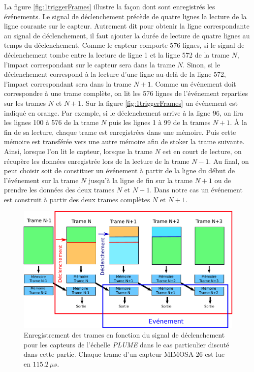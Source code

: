   \medskip
  
  La figure \ref{fig:1triggerFrames} illustre la fa\c{c}on dont sont enregistr\'es les \'ev\'enements. Le signal de d\'eclenchement pr\'ec\`ede de quatre lignes la lecture de la ligne courante sur le capteur. Autrement dit pour obtenir la ligne correspondante au signal de d\'eclenchement, il faut ajouter la dur\'ee de lecture de quatre lignes au temps du d\'eclenchement. Comme le capteur comporte 576 lignes, si le signal de d\'eclenchement tombe entre la lecture de ligne 1 et la ligne 572 de la trame $N$, l'impact correspondant sur le capteur sera dans la trame $N$. Sinon, si le d\'eclenchement correspond \`a la lecture d'une ligne au-delà de la ligne 572, l'impact correspondant sera dans la trame $N+1$. Comme un \'ev\'enement doit correspondre \`a une trame compl\`ete, on lit les 576 lignes de l'\'ev\'enement reparties sur les trames $N$ et $N+1$. Sur la figure \ref{fig:1triggerFrames} un \'ev\'enement est indiqu\'e en orange. Par exemple, si le d\'eclenchement arrive \`a la ligne 96, on lira les lignes 100 \`a 576 de la trame $N$ puis les lignes 1 \`a 99 de la trames $N+1$. \`A la fin de sa lecture, chaque trame est enregistr\'ees dans une m\'emoire. Puis cette m\'emoire est transf\'erée vers une autre m\'emoire afin de stoker la trame suivante. Ainsi, lorsque l'on lit le capteur, lorsque la trame $N$ est en court de lecture, on r\'ecup\`ere les donn\'ees enregistr\'ee lors de la lecture de la trame $N-1$. Au final, on peut choisir soit de constituer un \'ev\'enement \`a partir de la ligne du d\'ebut de l'\'ev\'enement sur la trame $N$ jusqu'\`a la ligne de fin sur la trame $N+1$ ou de prendre les donn\'ees des deux trames $N$ et $N+1$. Dans notre cas un \'ev\'enement est construit \`a partir des deux trames compl\`etes $N$ et $N+1$.
  

  \begin{figure}[!htb]
    \begin{center} 
     \includegraphics[scale=0.8]{./figures/lecture_Mi26_PLUME_2triggers.pdf}
     \caption{Enregistrement des trames en fonction du signal de d\'eclenchement pour les capteurs de l'\'echelle \textit{PLUME} dans le cas particulier discut\'e dans cette partie. Chaque trame d'un capteur MIMOSA-26 est lue en $115.2 \, \mu s$.}
     \label{fig:2triggerFrames}
    \end{center}
   \end{figure} 

